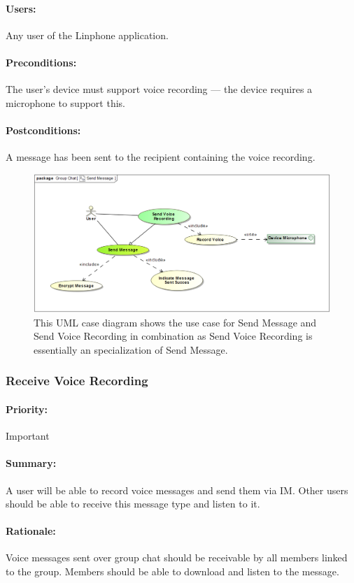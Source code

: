 \documentclass[11pt]{article}
\begin{document}
\paragraph{Users:} Any user of the Linphone application.
\paragraph{Preconditions:} The user's device must support voice recording --- the device requires a microphone to support this.
\paragraph{{Postconditions:}} A message has been sent to the recipient containing the voice recording.
\begin{figure}[H]
\centering
\includegraphics[width=5in]{./images/send_message_UC.png}
\caption[Send Message Use Case]{This UML case diagram shows the use case for Send Message and Send Voice Recording in combination as Send Voice Recording is essentially an specialization of Send Message.}
\label{UC-figure-send-message}
\end{figure}

\subsubsection{Receive Voice Recording} \label{UC-receive-voice}
\paragraph{Priority:} Important
\paragraph{Summary:} A user will be able to record voice messages and send them via IM. Other users should be able to receive this message type and listen to it.
\paragraph{Rationale:} Voice messages sent over group chat should be receivable by all members linked to the group. Members should be able to download and listen to the message.
\end{document}
